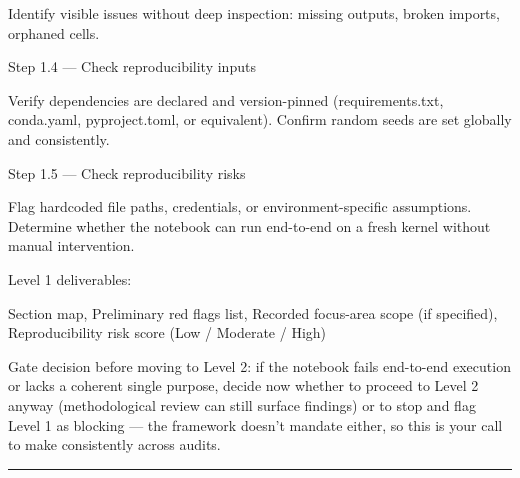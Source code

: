 \documentclass[11pt, a4paper]{article}
\begin{document}
Identify visible issues without deep inspection: missing outputs, broken imports, orphaned cells.

Step 1.4 — Check reproducibility inputs

Verify dependencies are declared and version-pinned (requirements.txt, conda.yaml, pyproject.toml, or equivalent).
Confirm random seeds are set globally and consistently.

Step 1.5 — Check reproducibility risks

Flag hardcoded file paths, credentials, or environment-specific assumptions.
Determine whether the notebook can run end-to-end on a fresh kernel without manual intervention.

Level 1 deliverables:

Section map,
Preliminary red flags list,
Recorded focus-area scope (if specified),
Reproducibility risk score (Low / Moderate / High)

Gate decision before moving to Level 2: if the notebook fails end-to-end execution or lacks a coherent single purpose, decide now whether to proceed to Level 2 anyway (methodological review can still surface findings) or to stop and flag Level 1 as blocking — the framework doesn't mandate either, so this is your call to make consistently across audits.

\vspace{.3cm}
\rule{\textwidth}{0.3pt}
\end{document}
